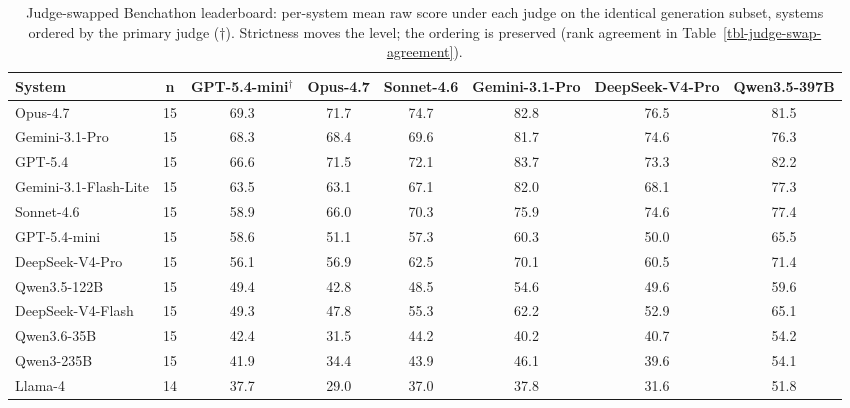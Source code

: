 \begin{table}[t]
\centering\footnotesize
\caption{Judge-swapped Benchathon leaderboard: per-system mean raw score under each judge on the identical generation subset, systems ordered by the primary judge ($\dagger$). Strictness moves the level; the ordering is preserved (rank agreement in Table~\ref{tbl-judge-swap-agreement}).}
\label{tbl-judge-swap}
\setlength{\tabcolsep}{3pt}
\begin{tabular*}{\textwidth}{@{\extracolsep{\fill}}lccccccc@{}}
\toprule
System & n & GPT-5.4-mini$^\dagger$ & Opus-4.7 & Sonnet-4.6 & Gemini-3.1-Pro & DeepSeek-V4-Pro & Qwen3.5-397B \\
\midrule
Opus-4.7 & 15 & 69.3 & 71.7 & 74.7 & 82.8 & 76.5 & 81.5 \\
Gemini-3.1-Pro & 15 & 68.3 & 68.4 & 69.6 & 81.7 & 74.6 & 76.3 \\
GPT-5.4 & 15 & 66.6 & 71.5 & 72.1 & 83.7 & 73.3 & 82.2 \\
Gemini-3.1-Flash-Lite & 15 & 63.5 & 63.1 & 67.1 & 82.0 & 68.1 & 77.3 \\
Sonnet-4.6 & 15 & 58.9 & 66.0 & 70.3 & 75.9 & 74.6 & 77.4 \\
GPT-5.4-mini & 15 & 58.6 & 51.1 & 57.3 & 60.3 & 50.0 & 65.5 \\
DeepSeek-V4-Pro & 15 & 56.1 & 56.9 & 62.5 & 70.1 & 60.5 & 71.4 \\
Qwen3.5-122B & 15 & 49.4 & 42.8 & 48.5 & 54.6 & 49.6 & 59.6 \\
DeepSeek-V4-Flash & 15 & 49.3 & 47.8 & 55.3 & 62.2 & 52.9 & 65.1 \\
Qwen3.6-35B & 15 & 42.4 & 31.5 & 44.2 & 40.2 & 40.7 & 54.2 \\
Qwen3-235B & 15 & 41.9 & 34.4 & 43.9 & 46.1 & 39.6 & 54.1 \\
Llama-4 & 14 & 37.7 & 29.0 & 37.0 & 37.8 & 31.6 & 51.8 \\
\bottomrule
\end{tabular*}
\end{table}
